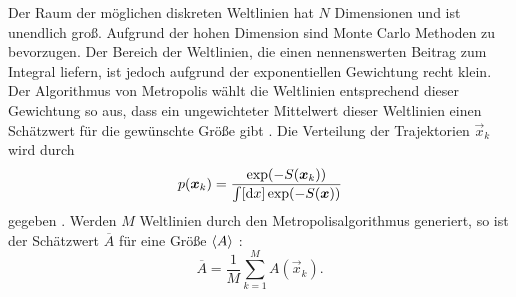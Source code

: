 Der Raum der möglichen diskreten Weltlinien hat $N$ Dimensionen und ist
unendlich groß. Aufgrund der hohen Dimension sind Monte Carlo Methoden zu
bevorzugen. Der Bereich der Weltlinien, die einen nennenswerten Beitrag zum
Integral liefern, ist jedoch aufgrund der exponentiellen Gewichtung recht
klein. Der Algorithmus von Metropolis wählt die Weltlinien entsprechend dieser
Gewichtung so aus, dass ein ungewichteter Mittelwert dieser Weltlinien einen
Schätzwert für die gewünschte Größe gibt
\parencite[434]{Creutz/Statistical_Approach_QM}. Die Verteilung der
Trajektorien $\vec x_k$ wird durch
\[
    p(\vec x_k) = \frac{\exp(-S(\vec x_k))}{\int [\dif x] \exp(-S(\vec x))}
\]
gegeben \parencite[(3.6)]{Creutz/Statistical_Approach_QM}. Werden $M$
Weltlinien durch den Metropolisalgorithmus generiert, so ist der Schätzwert
$\overline A$ für
eine Größe $\langle A \rangle$
\parencite[(3.7)]{Creutz/Statistical_Approach_QM}:
\[
    \overline A = \frac1M \sum_{k=1}^M A(\vec x_k).
\]





